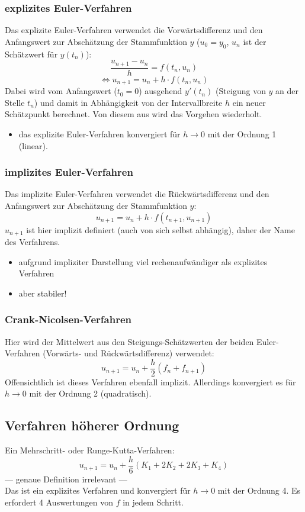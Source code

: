 \documentclass[a4paper, 12pt]{article}
\begin{document}
\subsubsection*{explizites Euler-Verfahren}
Das explizite Euler-Verfahren verwendet die Vorwärtsdifferenz und den Anfangswert zur Abschätzung der Stammfunktion \(y\) (\(u_0 = y_0\), \(u_n\) ist der Schätzwert für \(y(t_n)\)):
\[\frac{u_{n+1}-u_n}{h}=f(t_n,u_n)\]
\[\Leftrightarrow u_{n+1}=u_n+h\cdot f(t_n,u_n)\]
Dabei wird vom Anfangswert (\(t_0=0\)) ausgehend \(y'(t_n)\) (Steigung von \(y\) an der Stelle \(t_n\)) und damit in Abhängigkeit von der Intervallbreite \(h\) ein neuer Schätzpunkt berechnet. Von diesem aus wird das Vorgehen wiederholt.
\begin{itemize}
  \renewcommand{\labelitemi}{\Large{!}}%
  \item das explizite Euler-Verfahren konvergiert für \(h\rightarrow 0\) mit der Ordnung 1 (linear).
\end{itemize}


\subsubsection*{implizites Euler-Verfahren}
Das implizite Euler-Verfahren verwendet die Rückwärtsdifferenz und den Anfangswert zur Abschätzung der Stammfunktion \(y\):
\[u_{n+1}=u_n+h\cdot f(t_{n+1},u_{n+1})\]
\(u_{n+1}\) ist hier implizit definiert (auch von sich selbst abhängig), daher der Name des Verfahrens.
\begin{itemize}
  \item aufgrund impliziter Darstellung viel rechenaufwändiger als explizites Verfahren
  \item aber stabiler!
\end{itemize}

\subsubsection*{Crank-Nicolsen-Verfahren}
Hier wird der Mittelwert aus den Steigungs-Schätzwerten der beiden Euler-Verfahren (Vorwärts- und Rückwärtsdifferenz) verwendet:
\[u_{n+1}=u_n+\frac{h}{2}(f_n+f_{n+1})\]
Offensichtlich ist dieses Verfahren ebenfall implizit. Allerdings konvergiert es für \(h\rightarrow 0\) mit der Ordnung 2 (quadratisch).

\subsection{Verfahren höherer Ordnung}
Ein Mehrschritt- oder Runge-Kutta-Verfahren:
\[u_{n+1}=u_n+\frac{h}{6}(K_1+2K_2+2K_3+K_4)\]
--- genaue Definition irrelevant ---\\
Das ist ein explizites Verfahren und konvergiert für \(h\rightarrow 0\) mit der Ordnung 4. Es erfordert 4 Auswertungen von \(f\) in jedem Schritt.
\end{document}
